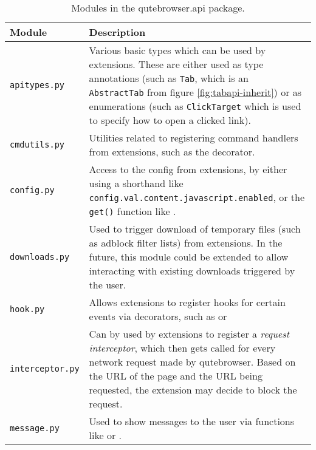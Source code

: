 \begin{table}[H]
  \centering
  \begin{tabulary}{\linewidth}{lL}
    \toprule
    Module & Description \\
    \midrule
    \verb|apitypes.py| & Various basic types which can be used by extensions.
                         These are either used as type annotations (such as
                         \verb|Tab|, which is an \verb|AbstractTab| from figure
                         \ref{fig:tabapi-inherit}) or as enumerations (such as
                         \verb|ClickTarget| which is used to specify how to open
                         a clicked link). \\
    \verb|cmdutils.py| & Utilities related to registering command handlers from
                         extensions, such as the 
                         decorator. \\
    \verb|config.py| & Access to the config from extensions, by either using a
                       shorthand like
                       \verb|config.val.content.javascript.enabled|, or the
                       \verb|get()| function like
                       . \\
    \verb|downloads.py| & Used to trigger download of temporary files (such as
                          adblock filter lists) from extensions. In the future,
                          this module could be extended to allow interacting
                          with existing downloads triggered by the user. \\
    \verb|hook.py| & Allows extensions to register hooks for certain events via
                     decorators, such as  or
                      \\
    \verb|interceptor.py| & Can by used by extensions to register a
                            \emph{request interceptor}, which then gets called
                            for every network request made by qutebrowser. Based
                            on the URL of the page and the URL being requested,
                            the extension may decide to block the request. \\
    \verb|message.py| & Used to show messages to the user via functions like
                         or . \\
    \bottomrule
  \end{tabulary}
  \caption{Modules in the qutebrowser.api package.}
  \label{tab:apimodule}
\end{table}

